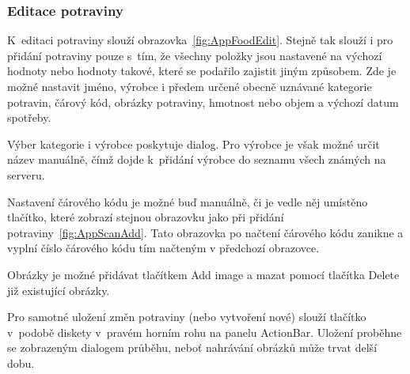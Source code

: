 \documentclass[thesis=B,czech]{FITthesis}[2013/10/20]
\begin{document}
\clearpage

\subsubsection{Editace potraviny}

K~editaci potraviny slouží obrazovka~\ref{fig:AppFoodEdit}. Stejně tak slouží i pro přidání potraviny pouze s~tím, že všechny položky jsou nastavené na výchozí hodnoty nebo hodnoty takové, které se podařilo zajistit jiným způsobem. Zde je možné nastavit jméno, výrobce i předem určené obecně uznávané kategorie potravin, čárový kód, obrázky potraviny, hmotnost nebo objem a výchozí datum spotřeby.

Výber kategorie i výrobce poskytuje dialog. Pro výrobce je však možné určit název manuálně, čímž dojde k~přidání výrobce do seznamu všech známých na serveru.

Nastavení čárového kódu je možné buď manuálně, či je vedle něj umístěno tlačítko, které zobrazí stejnou obrazovku jako při přidání potraviny~\ref{fig:AppScanAdd}. Tato obrazovka po načtení čárového kódu zanikne a vyplní číslo čárového kódu tím načteným v předchozí obrazovce.

Obrázky je možné přidávat tlačítkem Add image a mazat pomocí tlačítka Delete již existující obrázky.

Pro samotné uložení změn potraviny (nebo vytvoření nové) slouží tlačítko v~podobě diskety v~pravém horním rohu na panelu ActionBar. Uložení proběhne se zobrazeným dialogem průběhu, neboť nahrávání obrázků může trvat delší dobu.
\end{document}
